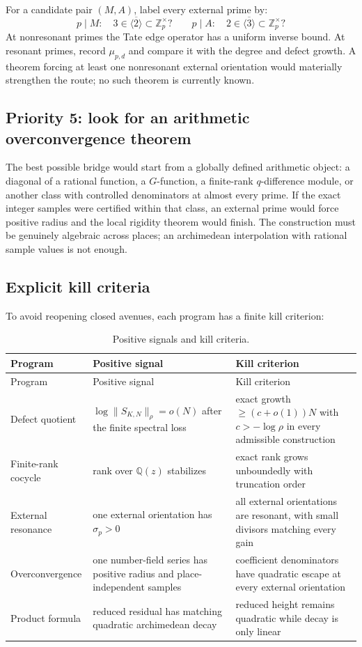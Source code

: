 \documentclass[11pt,oneside]{article}
\theoremstyle{definition}
\newcommand{\Z}{\mathbb Z}
\newcommand{\Q}{\mathbb Q}
\begin{document}
For a candidate pair $(M,A)$, label every external prime by:
\[
 p\mid M:\quad 3\in\overline{\langle2\rangle}\subset\Z_p^\times?
 \qquad
 p\mid A:\quad 2\in\overline{\langle3\rangle}\subset\Z_p^\times?
\]
At nonresonant primes the Tate edge operator has a uniform inverse bound.  At resonant primes,
record $\mu_{p,d}$ and compare it with the degree and defect growth.  A theorem forcing at
least one nonresonant external orientation would materially strengthen the route; no such
theorem is currently known.

\subsection{Priority 5: look for an arithmetic overconvergence theorem}

The best possible bridge would start from a globally defined arithmetic object: a diagonal of
a rational function, a $G$-function, a finite-rank $q$-difference module, or another class
with controlled denominators at almost every prime.  If the exact integer samples were
certified within that class, an external prime would force positive radius and the local
rigidity theorem would finish.  The construction must be genuinely algebraic across places;
an archimedean interpolation with rational sample values is not enough.

\subsection{Explicit kill criteria}

To avoid reopening closed avenues, each program has a finite kill criterion:

\begin{longtable}{@{}p{}p{}p{}@{}}
\caption{Positive signals and kill criteria.}\label{tab:kill-criteria}\\
\toprule
Program & Positive signal & Kill criterion\\
\midrule
\endfirsthead
\toprule
Program & Positive signal & Kill criterion\\
\midrule
\endhead
Defect quotient & $\log\lVert S_{K,N}\rVert_\rho=o(N)$ after the finite spectral loss & exact growth $\ge(c+o(1))N$ with $c> -\log\rho$ in every admissible construction\\
Finite-rank cocycle & rank over $\Q(z)$ stabilizes & exact rank grows unboundedly with truncation order\\
External resonance & one external orientation has $\sigma_p>0$ & all external orientations are resonant, with small divisors matching every gain\\
Overconvergence & one number-field series has positive radius and place-independent samples & coefficient denominators have quadratic escape at every external orientation\\
Product formula & reduced residual has matching quadratic archimedean decay & reduced height remains quadratic while decay is only linear\\
\bottomrule
\end{longtable}
\end{document}
